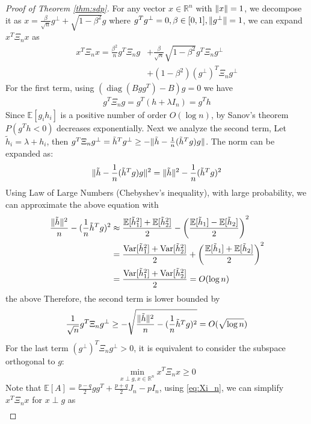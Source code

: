 \documentclass[conference]{IEEEtran}
\DeclarePairedDelimiter\norm{\lVert}{\rVert}
\DeclareMathOperator{\Var}{Var}
\DeclareMathOperator{\diag}{diag}
\begin{document}
\begin{proof}[Proof of Theorem \ref{thm:sdp}]
		For any vector $x \in \mathbb{R}^n$ with $\norm{x}=1$, we decompose it as $x=\frac{\beta}{\sqrt{n}} g^{\perp}
		+ \sqrt{1-\beta^2} g$ where $g^Tg^{\perp}=0, \beta \in [0,1], \norm{g^{\perp}}=1$, we can expand $x^T \Xi_n x$ as
		\begin{align*}
		x^T \Xi_n x = \frac{\beta^2}{n} g^T \Xi_n g  &
		+		\frac{\beta}{\sqrt{n}}\sqrt{1-\beta^2} g^T \Xi_n g^{\perp}
		 \\
		&+
		(1-\beta^2)(g^{\perp})^T \Xi_n g^{\perp} 
		\end{align*}
		For the first term, using $(\diag(Bgg^T) - B)g=0$ we have
		\begin{align*}
		g^T \Xi_n g = g^T(h+\lambda I_n) = g^T h
		\end{align*}
		Since $\mathbb{E}[g_ih_i]$ is a positive number of order $O(\log n)$, by Sanov's theorem
		$P(g^T h < 0)$ decreases exponentially. Next we analyze the second term, Let $\tilde{h}_i
		=\lambda+h_i$, then
		$g^T \Xi_n g^{\perp} = \tilde{h}^T g^{\perp} \geq -\norm{\tilde{h}-\frac{1}{n}(\tilde{h}^Tg)g}$.
		The norm can be expanded as:
		\begin{align*}
		\norm{\tilde{h}-\frac{1}{n}(\tilde{h}^Tg)g}^2
		=\norm{\tilde{h}}^2 - \frac{1}{n}(\tilde{h}^Tg)^2
		\end{align*}
		Using Law of Large Numbers (Chebyshev's inequality), with large probability, we can approximate
		the above equation with 
		\begin{align*}
\frac{\norm{\tilde{h}}^2}{n} - (\frac{1}{n}\tilde{h}^Tg)^2
&\approx \frac{\mathbb{E}[\tilde{h}_1^2]+\mathbb{E}[\tilde{h}_2^2]}{2}
- \left(\frac{\mathbb{E}[\tilde{h}_1]-\mathbb{E}[\tilde{h}_2]}{2}\right)^2 \\
&= \frac{\Var[\tilde{h}_1^2]+\Var[\tilde{h}_2^2]}{2}
+ \left(\frac{\mathbb{E}[\tilde{h}_1]+\mathbb{E}[\tilde{h}_2]}{2}\right)^2 \\
& =  \frac{\Var[\tilde{h}_1^2]+\Var[\tilde{h}_2^2]}{2} = O(\log n)
\end{align*}		
		the above 
		Therefore, the second term is lower bounded by
		$$
			\frac{1}{\sqrt{n}} g^T \Xi_n g^{\perp} \geq -\sqrt{\frac{\norm{\tilde{h}}^2}{n} - (\frac{1}{n}\tilde{h}^Tg)^2} = O(\sqrt{\log n})
		$$
		For the last term $(g^{\perp})^T \Xi_n g^{\perp} >0$, it is equivalent
		to consider the subspace orthogonal to $g$:
		$$
		\min_{x \perp g, x \in \mathbb{R}^n } x^T \Xi_n x \geq 0
		$$
		Note that $\mathbb{E}[A] = \frac{p-q}{2}gg^T + \frac{p+q}{2}J_n - pI_n$,
		using \eqref{eq:Xi_n}, we can simplify $x^T \Xi_n x$ for $x \perp g$ as
		\begin{align*}

\end{align*}
\end{proof}
\end{document}

